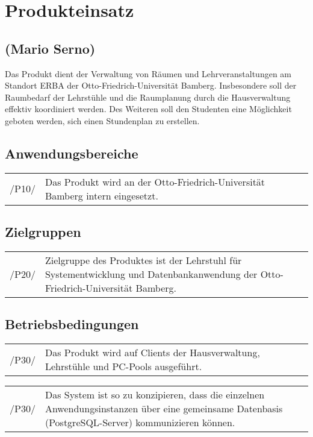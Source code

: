 \section{Produkteinsatz}
\label{sec:Produkteinsatz}

\subsection*{(Mario Serno)}

Das Produkt dient der Verwaltung von Räumen und Lehrveranstaltungen am Standort ERBA der Otto-Friedrich-Universität Bamberg. Insbesondere soll der Raumbedarf der Lehrstühle und die Raumplanung durch die Hausverwaltung effektiv koordiniert werden. Des Weiteren soll den Studenten eine Möglichkeit geboten werden, sich einen Stundenplan zu erstellen.

\subsection{Anwendungsbereiche}
\begin{tabular}{p{1.5cm}p{14.5cm}}	
	 /P10/& Das Produkt wird an der Otto-Friedrich-Universität Bamberg intern eingesetzt. \\[0.25cm]
\end{tabular}


\subsection{Zielgruppen}
\begin{tabular}{p{1.5cm}p{14.5cm}}	
	 /P20/& Zielgruppe des Produktes ist der Lehrstuhl für Systementwicklung und Datenbankanwendung der Otto-Friedrich-Universität Bamberg. \\[0.25cm]
\end{tabular}


\subsection{Betriebsbedingungen}
\begin{tabular}{p{1.5cm}p{14.5cm}}	
	 /P30/& Das Produkt wird auf Clients der Hausverwaltung, Lehrstühle und PC-Pools ausgeführt. \\[0.25cm]
\end{tabular}

\begin{tabular}{p{1.5cm}p{14.5cm}}	
	 /P30/& Das System ist so zu konzipieren, dass die einzelnen Anwendungsinstanzen über eine gemeinsame Datenbasis (PostgreSQL-Server) kommunizieren können. \\[0.25cm]
\end{tabular}

